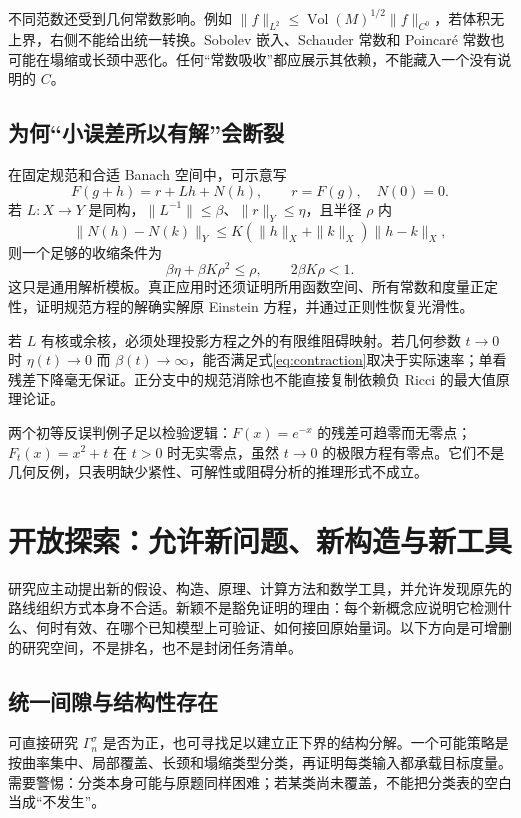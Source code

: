 \documentclass[11pt,a4paper]{article}
\theoremstyle{definition}
\newcommand{\Vol}{\operatorname{Vol}}
\begin{document}
不同范数还受到几何常数影响。例如 $\|f\|_{L^2}\le\Vol(M)^{1/2}\|f\|_{C^0}$，若体积无上界，右侧不能给出统一转换。Sobolev 嵌入、Schauder 常数和 Poincaré 常数也可能在塌缩或长颈中恶化。任何“常数吸收”都应展示其依赖，不能藏入一个没有说明的 $C$。

\subsection{为何“小误差所以有解”会断裂}

在固定规范和合适 Banach 空间中，可示意写
\[
F(g+h)=r+Lh+N(h),\qquad r=F(g),\quad N(0)=0.
\]
若 $L:X\to Y$ 是同构，$\|L^{-1}\|\le\beta$、$\|r\|_Y\le\eta$，且半径 $\rho$ 内
\[
\|N(h)-N(k)\|_Y\le K(\|h\|_X+\|k\|_X)\|h-k\|_X,
\]
则一个足够的收缩条件为
\begin{equation}\label{eq:contraction}
\beta\eta+\beta K\rho^2\le\rho,\qquad2\beta K\rho<1.
\end{equation}
这只是通用解析模板。真正应用时还须证明所用函数空间、所有常数和度量正定性，证明规范方程的解确实解原 Einstein 方程，并通过正则性恢复光滑性。

若 $L$ 有核或余核，必须处理投影方程之外的有限维阻碍映射。若几何参数 $t\to0$ 时 $\eta(t)\to0$ 而 $\beta(t)\to\infty$，能否满足式\eqref{eq:contraction}取决于实际速率；单看残差下降毫无保证。正分支中的规范消除也不能直接复制依赖负 Ricci 的最大值原理论证。

两个初等反误判例子足以检验逻辑：$F(x)=e^{-x}$ 的残差可趋零而无零点；$F_t(x)=x^2+t$ 在 $t>0$ 时无实零点，虽然 $t\to0$ 的极限方程有零点。它们不是几何反例，只表明缺少紧性、可解性或阻碍分析的推理形式不成立。

\section{开放探索：允许新问题、新构造与新工具}\label{sec:exploration}

研究应主动提出新的假设、构造、原理、计算方法和数学工具，并允许发现原先的路线组织方式本身不合适。新颖不是豁免证明的理由：每个新概念应说明它检测什么、何时有效、在哪个已知模型上可验证、如何接回原始量词。以下方向是可增删的研究空间，不是排名，也不是封闭任务清单。

\subsection{统一间隙与结构性存在}

可直接研究 $\Gamma_n^\sigma$ 是否为正，也可寻找足以建立正下界的结构分解。一个可能策略是按曲率集中、局部覆盖、长颈和塌缩类型分类，再证明每类输入都承载目标度量。需要警惕：分类本身可能与原题同样困难；若某类尚未覆盖，不能把分类表的空白当成“不发生”。
\end{document}
